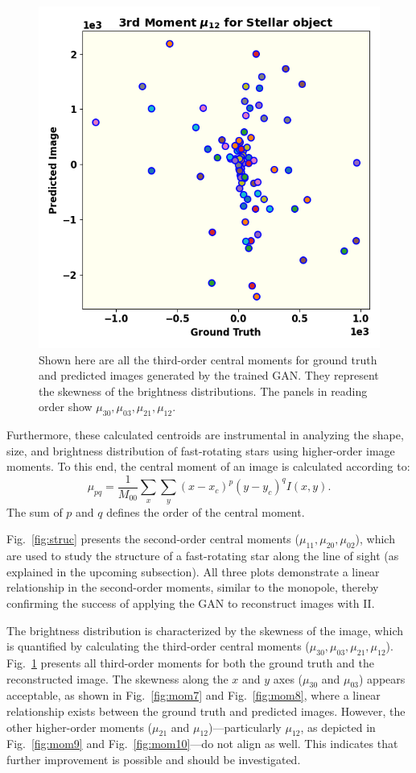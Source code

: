 \begin{figure}
  \includegraphics[width=.49\linewidth]{fig/moments/mom9.png}
  \caption{Shown here are all the third-order central moments for
    ground truth and predicted images generated by the trained GAN.
    They represent the skewness of the brightness distributions.  The
    panels in reading order show
    $\mu_{30},\mu_{03},\mu_{21},\mu_{12}$.}
  \label{fig:moments}
\end{figure}
Furthermore, these calculated centroids are instrumental in analyzing the shape, size, and brightness distribution of fast-rotating stars using higher-order image moments. To this end, the central moment of an image is calculated according to:
\begin{equation}
	\mu_{pq} = \frac{1}{M_{00}}\sum_{x} \sum_{y} (x - x_c)^p (y - y_c)^q I(x, y).
\end{equation}
The sum of \(p\) and \(q\) defines the order of the central moment. 

Fig.~\ref{fig:struc} presents the second-order central moments (\(\mu_{11}, \mu_{20}, \mu_{02}\)), which are used to study the structure of a fast-rotating star along the line of sight (as explained in the upcoming subsection). All three plots demonstrate a linear relationship in the second-order moments, similar to the monopole, thereby confirming the success of applying the GAN to reconstruct images with II.

The brightness distribution is characterized by the skewness of the image, which is quantified by calculating the third-order central moments (\(\mu_{30}, \mu_{03}, \mu_{21}, \mu_{12}\)). Fig.~\ref{fig:moments} presents all third-order moments for both the ground truth and the reconstructed image. The skewness along the $x$ and $y$ axes (\(\mu_{30}\) and \(\mu_{03}\)) appears acceptable, as shown in Fig.~\ref{fig:mom7} and Fig.~\ref{fig:mom8}, where a linear relationship exists between the ground truth and predicted images. However, the other higher-order moments (\(\mu_{21}\) and \(\mu_{12}\))—particularly \(\mu_{12}\), as depicted in Fig.~\ref{fig:mom9} and Fig.~\ref{fig:mom10}—do not align as well. This indicates that further improvement is possible and should be investigated.

